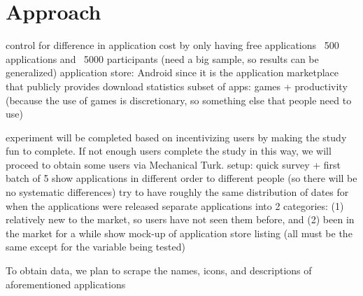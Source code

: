 \section{Approach}


control for difference in application cost by only having free applications
~500 applications and ~5000 participants (need a big sample, so results can be generalized)
application store: Android since it is the application marketplace that publicly provides download statistics
subset of apps: games + productivity (because the use of games is discretionary, so something else that people need to use)

experiment will be completed based on incentivizing users by making the study fun to complete. If not enough users complete the study in this way, we will proceed to obtain some users via Mechanical Turk.
setup: quick survey + first batch of 5
show applications in different order to different people (so there will be no systematic differences)
try to have roughly the same distribution of dates for when the applications were released
separate applications into 2 categories: (1) relatively new to the market, so users have not seen them before, and (2) been in the market for a while
show mock-up of application store listing (all must be the same except for the variable being tested)

To obtain data, we plan to scrape the names, icons, and descriptions of aforementioned applications